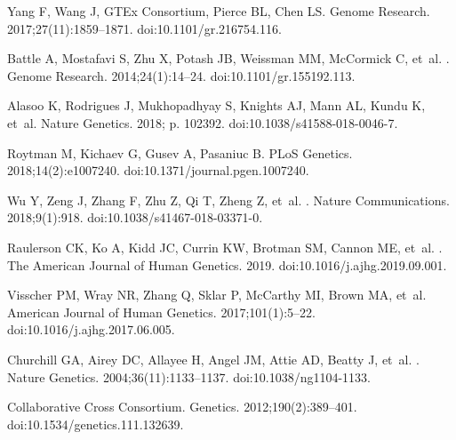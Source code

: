 \documentclass[10pt,letterpaper]{article}
\begin{document}
\begin{thebibliography}{10}
Yang F, Wang J, {GTEx Consortium}, Pierce BL, Chen LS.
\newblock Genome Research. 2017;27(11):1859--1871.
\newblock doi:{10.1101/gr.216754.116}.

Battle A, Mostafavi S, Zhu X, Potash JB, Weissman MM, McCormick C, et~al.
.
\newblock Genome Research. 2014;24(1):14--24.
\newblock doi:{10.1101/gr.155192.113}.

Alasoo K, Rodrigues J, Mukhopadhyay S, Knights AJ, Mann AL, Kundu K, et~al.
\newblock Nature Genetics. 2018; p. 102392.
\newblock doi:{10.1038/s41588-018-0046-7}.

Roytman M, Kichaev G, Gusev A, Pasaniuc B.
\newblock PLoS Genetics. 2018;14(2):e1007240.
\newblock doi:{10.1371/journal.pgen.1007240}.

Wu Y, Zeng J, Zhang F, Zhu Z, Qi T, Zheng Z, et~al.
.
\newblock Nature Communications. 2018;9(1):918.
\newblock doi:{10.1038/s41467-018-03371-0}.

Raulerson CK, Ko A, Kidd JC, Currin KW, Brotman SM, Cannon ME, et~al.
.
\newblock The American Journal of Human Genetics. 2019.
\newblock doi:{10.1016/j.ajhg.2019.09.001}.

Visscher PM, Wray NR, Zhang Q, Sklar P, McCarthy MI, Brown MA, et~al.
\newblock American Journal of Human Genetics. 2017;101(1):5--22.
\newblock doi:{10.1016/j.ajhg.2017.06.005}.

Churchill GA, Airey DC, Allayee H, Angel JM, Attie AD, Beatty J, et~al.
.
\newblock Nature Genetics. 2004;36(11):1133--1137.
\newblock doi:{10.1038/ng1104-1133}.

{Collaborative Cross Consortium}.
\newblock Genetics. 2012;190(2):389--401.
\newblock doi:{10.1534/genetics.111.132639}.


\end{thebibliography}
\end{document}
